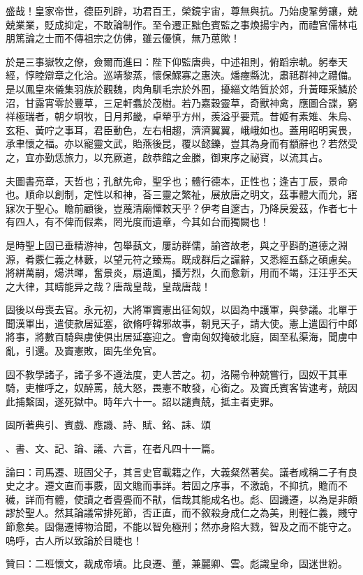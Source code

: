 \begin{pinyinscope}
盛哉！皇家帝世，德臣列辟，功君百王，榮鏡宇宙，尊無與抗。乃始虔鞏勞讓，兢兢業業，貶成抑定，不敢論制作。至令遷正黜色賓監之事煥揚宇內，而禮官儒林屯朋篤論之士而不傳祖宗之仿佛，雖云優慎，無乃葸歟！

於是三事嶽牧之僚，僉爾而進曰：陛下仰監唐典，中述祖則，俯蹈宗軌。躬奉天經，惇睦辯章之化洽。巡靖黎蒸，懷保鰥寡之惠浹。燔瘞縣沈，肅祗群神之禮備。是以鳳皇來儀集羽族於觀魏，肉角馴毛宗於外囿，擾緇文皓質於郊，升黃暉采鱗於沼，甘露宵零於豐草，三足軒翥於茂樹。若乃嘉穀靈草，奇獸神禽，應圖合諜，窮祥極瑞者，朝夕坰牧，日月邦畿，卓犖乎方州，羨溢乎要荒。昔姬有素雉、朱烏、玄秬、黃咛之事耳，君臣動色，左右相趨，濟濟翼翼，峨峨如也。蓋用昭明寅畏，承聿懷之福。亦以寵靈文武，貽燕後昆，覆以懿鑠，豈其為身而有顓辭也？若然受之，宜亦勤恁旅力，以充厥道，啟恭館之金縢，御東序之祕寶，以流其占。

夫圖書亮章，天哲也；孔猷先命，聖孚也；體行德本，正性也；逢吉丁辰，景命也。順命以創制，定性以和神，荅三靈之繁祉，展放唐之明文，茲事體大而允，寤寐次于聖心。瞻前顧後，豈蔑清廟憚敕天乎？伊考自邃古，乃降戾爰茲，作者七十有四人，有不俾而假素，罔光度而遺章，今其如台而獨闕也！

是時聖上固已垂精游神，包舉蓺文，屢訪群儒，諭咨故老，與之乎斟酌道德之淵源，肴覈仁義之林藪，以望元符之臻焉。既成群后之讜辭，又悉經五繇之碩慮矣。將絣萬嗣，煬洪暉，奮景炎，扇遺風，播芳烈，久而愈新，用而不竭，汪汪乎丕天之大律，其疇能异之哉？唐哉皇哉，皇哉唐哉！

固後以母喪去官。永元初，大將軍竇憲出征匈奴，以固為中護軍，與參議。北單于聞漢軍出，遣使款居延塞，欲脩呼韓邪故事，朝見天子，請大使。憲上遣固行中郎將事，將數百騎與虜使俱出居延塞迎之。會南匈奴掩破北庭，固至私渠海，聞虜中亂，引還。及竇憲敗，固先坐免官。

固不教學諸子，諸子多不遵法度，吏人苦之。初，洛陽令种兢嘗行，固奴干其車騎，吏椎呼之，奴醉罵，兢大怒，畏憲不敢發，心銜之。及竇氏賓客皆逮考，兢因此捕繫固，遂死獄中。時年六十一。詔以譴責兢，抵主者吏罪。

固所著典引、賓戲、應譏、詩、賦、銘、誄、頌

、書、文、記、論、議、六言，在者凡四十一篇。

論曰：司馬遷、班固父子，其言史官載籍之作，大義粲然著矣。議者咸稱二子有良史之才。遷文直而事覈，固文贍而事詳。若固之序事，不激詭，不抑抗，贍而不穢，詳而有體，使讀之者亹亹而不猒，信哉其能成名也。彪、固譏遷，以為是非頗謬於聖人。然其論議常排死節，否正直，而不敘殺身成仁之為美，則輕仁義，賤守節愈矣。固傷遷博物洽聞，不能以智免極刑；然亦身陷大戮，智及之而不能守之。嗚呼，古人所以致論於目睫也！

贊曰：二班懷文，裁成帝墳。比良遷、董，兼麗卿、雲。彪識皇命，固迷世紛。


\end{pinyinscope}